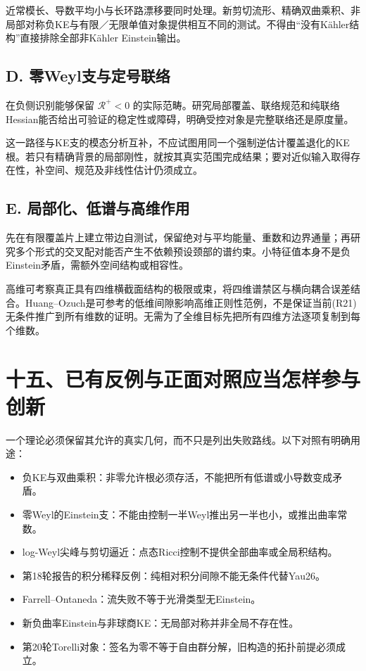 \documentclass[
  11pt,
  a4paper,
  fontset=none]{ctexart}
\providecommand{\tightlist}{%
  \setlength{\itemsep}{0pt}\setlength{\parskip}{0pt}}
\begin{document}
近常模长、导数平均小与长环路漂移要同时处理。新剪切流形、精确双曲乘积、非局部对称负KE与有限／无限单值对象提供相互不同的测试。不得由``没有Kähler结构''直接排除全部非Kähler
Einstein输出。

\subsection{D.
零Weyl支与定号联络}\label{d.-ux96f6weylux652fux4e0eux5b9aux53f7ux8054ux7edc}

在负侧识别能够保留 \(\mathcal R^+<0\)
的实际范畴。研究局部覆盖、联络规范和纯联络Hessian能否给出可验证的稳定性或障碍，明确受控对象是完整联络还是原度量。

这一路径与KE支的模态分析互补，不应试图用同一个强制逆估计覆盖退化的KE根。若只有精确背景的局部刚性，就按其真实范围完成结果；要对近似输入取得存在性，补空间、规范及非线性估计仍须成立。

\subsection{E.
局部化、低谱与高维作用}\label{e.-ux5c40ux90e8ux5316ux4f4eux8c31ux4e0eux9ad8ux7ef4ux4f5cux7528}

先在有限覆盖片上建立带边自测试，保留绝对与平均能量、重数和边界通量；再研究多个形式的交叉配对能否产生不依赖预设颈部的谱约束。小特征值本身不是负Einstein矛盾，需额外空间结构或相容性。

高维可考察真正具有四维横截面结构的极限或束，将四维谱禁区与横向耦合误差结合。Huang--Ozuch是可参考的低维间隙影响高维正则性范例，不是保证当前(R21)无条件推广到所有维数的证明。无需为了全维目标先把所有四维方法逐项复制到每个维数。

\section{十五、已有反例与正面对照应当怎样参与创新}\label{ux5341ux4e94ux5df2ux6709ux53cdux4f8bux4e0eux6b63ux9762ux5bf9ux7167ux5e94ux5f53ux600eux6837ux53c2ux4e0eux521bux65b0}

一个理论必须保留其允许的真实几何，而不只是列出失败路线。以下对照有明确用途：

\begin{itemize}
\tightlist
\item
  负KE与双曲乘积：非零允许根必须存活，不能把所有低谱或小导数变成矛盾。
\item
  零Weyl的Einstein支：不能由控制一半Weyl推出另一半也小，或推出曲率常数。
\item
  log-Weyl尖峰与剪切逼近：点态Ricci控制不提供全部曲率或全局积结构。
\item
  第18轮报告的积分稀释反例：纯相对积分间隙不能无条件代替Yau26。
\item
  Farrell--Ontaneda：流失败不等于光滑类型无Einstein。
\item
  新负曲率Einstein与非球商KE：无局部对称并非全局不存在性。
\item
  第20轮Torelli对象：签名为零不等于自由群分解，旧构造的拓扑前提必须成立。
\end{itemize}
\end{document}
